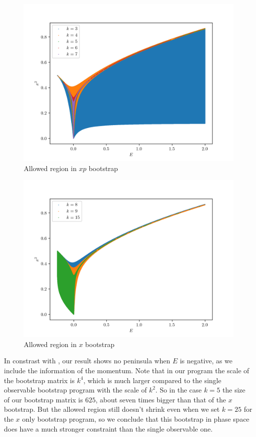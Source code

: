 \documentclass[aps, preprint,amsmath, amssymb]{revtex4-2}
\begin{document}
\begin{figure}
	\includegraphics[width=0.8\linewidth]{double_well_xp.png}
	\caption{Allowed region in $xp$ bootstrap}
	\label{fig:doublewell}
\end{figure}
\begin{figure}
	\includegraphics[width=0.8\linewidth]{double_well_x.png}
	\caption{Allowed region in $x$ bootstrap}
\end{figure}

%

In constrast with \cite{Nakayama_2022}, our result shows no peninsula when $E$ is negative, as we include the information of the momentum. Note that in our program the scale of the bootstrap matrix is $k^4$, which is much larger compared to the single observable bootstrap program with the scale of $k^2$. So in the case $k=5$ the size of our bootstrap matrix is $625$, about seven times bigger than that of the $x$ bootstrap. But the allowed region still doesn't shrink even when we set $k = 25$ for the $x$ only bootstrap program, so we conclude that this bootstrap in phase space does have a much stronger constraint than the single observable one.
\end{document}
